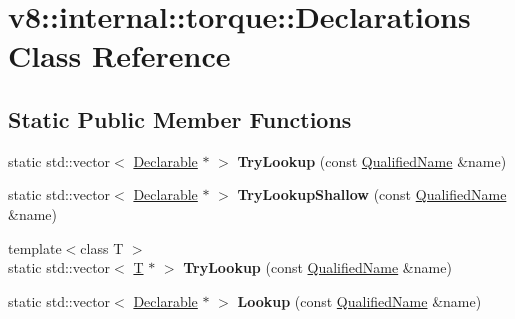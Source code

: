 \hypertarget{classv8_1_1internal_1_1torque_1_1Declarations}{}\section{v8\+:\+:internal\+:\+:torque\+:\+:Declarations Class Reference}
\label{classv8_1_1internal_1_1torque_1_1Declarations}
\subsection*{Static Public Member Functions}
\begin{DoxyCompactItemize}
\item 
\mbox{\label{classv8_1_1internal_1_1torque_1_1Declarations_aa3144a7756187aa136d857ecf3f83cb2}} 
static std\+::vector$<$ \mbox{\hyperlink{classv8_1_1internal_1_1torque_1_1Declarable}{Declarable}} $\ast$ $>$ {\bfseries Try\+Lookup} (const \mbox{\hyperlink{structv8_1_1internal_1_1torque_1_1QualifiedName}{Qualified\+Name}} \&name)
\item 
\mbox{\label{classv8_1_1internal_1_1torque_1_1Declarations_aae13b5c58c96fe0ac89ef2c0f49a52c6}} 
static std\+::vector$<$ \mbox{\hyperlink{classv8_1_1internal_1_1torque_1_1Declarable}{Declarable}} $\ast$ $>$ {\bfseries Try\+Lookup\+Shallow} (const \mbox{\hyperlink{structv8_1_1internal_1_1torque_1_1QualifiedName}{Qualified\+Name}} \&name)
\item 
\mbox{\label{classv8_1_1internal_1_1torque_1_1Declarations_a702d57ae95fe79538f4a1c4095e8fec6}} 
{\footnotesize template$<$class T $>$ }\\static std\+::vector$<$ \mbox{\hyperlink{classv8_1_1internal_1_1torque_1_1T}{T}} $\ast$ $>$ {\bfseries Try\+Lookup} (const \mbox{\hyperlink{structv8_1_1internal_1_1torque_1_1QualifiedName}{Qualified\+Name}} \&name)
\item 
\mbox{\label{classv8_1_1internal_1_1torque_1_1Declarations_a7f0add2c25472360e6ebc130aa281ef3}} 
static std\+::vector$<$ \mbox{\hyperlink{classv8_1_1internal_1_1torque_1_1Declarable}{Declarable}} $\ast$ $>$ {\bfseries Lookup} (const \mbox{\hyperlink{structv8_1_1internal_1_1torque_1_1QualifiedName}{Qualified\+Name}} \&name)

\end{DoxyCompactItemize}
